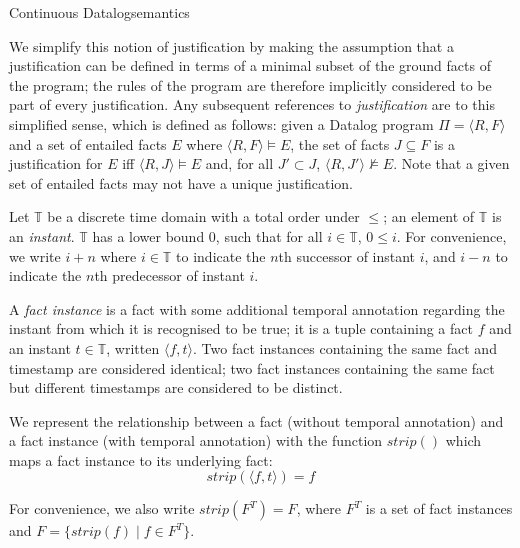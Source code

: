 \begin{nestedsection}{Continuous Datalog}{semantics}
\begin{definition}[Justification]
We simplify this notion of justification by making the assumption that
a justification can be defined in terms of a minimal subset of the
ground facts of the program; the rules of the program are therefore
implicitly considered to be part of every justification. Any
subsequent references to {\em justification} are to this simplified
sense, which is defined as follows: given a Datalog program $\Pi =
\langle R, F \rangle$ and a set of entailed facts $E$ where $\langle
R, F \rangle \models E$, the set of facts $J \subseteq F$ is a
justification for $E$ iff $\langle R, J \rangle \models E$ and, for
all $J' \subset J$, $\langle R, J' \rangle \not\models E$. Note that a
given set of entailed facts may not have a unique justification.

\end{definition}

\begin{definition}

Let $\mathbb{T}$ be a discrete time domain with a total order under
$\leqslant$; an element of $\mathbb{T}$ is an {\em instant}.
$\mathbb{T}$ has a lower bound $0$, such that for all $i \in
\mathbb{T}$, $0 \leqslant i$. For convenience, we write $i+n$ where $i
\in \mathbb{T}$ to indicate the $n$th successor of instant $i$,
and $i-n$ to indicate the $n$th predecessor of instant $i$.

\end{definition}

\begin{definition}

A {\em fact instance} is a fact with some additional temporal
annotation regarding the instant from which it is recognised to be true;
it is a tuple containing a fact $f$ and an instant $t \in
\mathbb{T}$, written $\langle f, t \rangle$. Two fact instances
containing the same fact and timestamp are considered identical; two
fact instances containing the same fact but different timestamps are
considered to be distinct.

We represent the relationship between a fact (without temporal
annotation) and a fact instance (with temporal annotation) with the
function $strip()$ which maps a fact instance to its underlying fact:
\[ strip(\langle f, t\rangle) = f \]

For convenience, we also write $strip(F^T) = F$, where $F^T$ is a set
of fact instances and $F = \{ strip(f) \mid f \in F^T \}$.


\end{definition}
\end{nestedsection}
